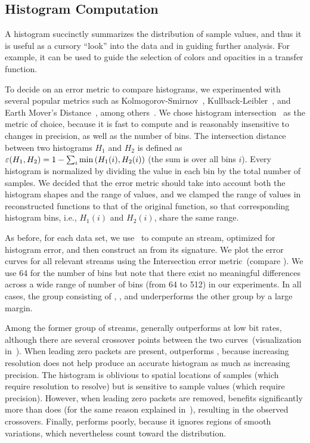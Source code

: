 \subsection{Histogram Computation}\label{sec:histogram}

A histogram succinctly summarizes the distribution of sample values, and thus it is useful as a
cursory ``look'' into the data and in guiding further analysis. For example, it can be used to guide
the selection of colors and opacities in a transfer function.

To decide on an error metric to compare histograms, we experimented with several popular metrics
such as Kolmogorov-Smirnov~\cite{smirnov1948}, Kullback-Leibler~\cite{kullback1951}, and Earth
Mover's Distance~\cite{emd1998}, among others~\cite{Hellinger1909,Bhattacharyya1943}. We chose
histogram intersection~\cite{histogram_intersection1991} as the metric of choice, because it is fast
to compute and is reasonably insensitive to changes in precision, as well as the number of bins. The
intersection distance between two histograms $H_1$ and $H_2$ is defined as
$\err(H_1,H_2)=1-\sum_{i}{\min{(H_1(i),H_2(i))}}$ (the sum is over all bins $i$). Every histogram is
normalized by dividing the value in each bin by the total number of samples. We decided that the
error metric should take into account both the histogram shapes and the range of values, and we
clamped the range of values in reconstructed functions to that of the original function, so that
corresponding histogram bins, i.e., $H_1(i)$ and $H_2(i)$, share the same range.

As before, for each data set, we use~ to compute an \shop stream, optimized for
histogram error, and then construct an \shsg from its signature. We plot the error curves for all
relevant streams using the Intersection error metric~(compare
). We use 64 for the number of bins but note that there exist
no meaningful differences across a wide range of number of bins (from 64 to 512) in our experiments.
In all cases, the group consisting of \sbit, \slvl, and \smag underperforms the other group by a
large margin.

Among the former group of streams, \slvl generally outperforms \sbit at low bit rates, although
there are several crossover points between the two curves~(visualization
in~). When leading zero packets are present, \slvl outperforms \sbit,
because increasing resolution does not help produce an accurate histogram as much as increasing
precision. The histogram is oblivious to spatial locations of samples (which require resolution to
resolve) but is sensitive to sample values (which require precision). However, when leading zero
packets are removed, \sbit benefits significantly more than \slvl does (for the same reason
explained in~), resulting in the observed crossovers. Finally, \smag
performs poorly, because it ignores regions of smooth variations, which nevertheless count toward
the distribution.

